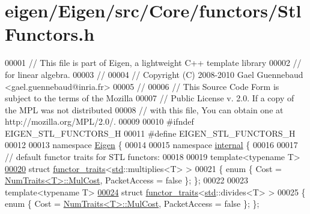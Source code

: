 \hypertarget{eigen_2_eigen_2src_2_core_2functors_2_stl_functors_8h_source}{}\section{eigen/\+Eigen/src/\+Core/functors/\+Stl\+Functors.h}
\label{eigen_2_eigen_2src_2_core_2functors_2_stl_functors_8h_source}

\begin{DoxyCode}
00001 \textcolor{comment}{// This file is part of Eigen, a lightweight C++ template library}
00002 \textcolor{comment}{// for linear algebra.}
00003 \textcolor{comment}{//}
00004 \textcolor{comment}{// Copyright (C) 2008-2010 Gael Guennebaud <gael.guennebaud@inria.fr>}
00005 \textcolor{comment}{//}
00006 \textcolor{comment}{// This Source Code Form is subject to the terms of the Mozilla}
00007 \textcolor{comment}{// Public License v. 2.0. If a copy of the MPL was not distributed}
00008 \textcolor{comment}{// with this file, You can obtain one at http://mozilla.org/MPL/2.0/.}
00009 
00010 \textcolor{preprocessor}{#ifndef EIGEN\_STL\_FUNCTORS\_H}
00011 \textcolor{preprocessor}{#define EIGEN\_STL\_FUNCTORS\_H}
00012 
00013 \textcolor{keyword}{namespace }\hyperlink{namespace_eigen}{Eigen} \{
00014 
00015 \textcolor{keyword}{namespace }\hyperlink{namespaceinternal}{internal} \{
00016 
00017 \textcolor{comment}{// default functor traits for STL functors:}
00018 
00019 \textcolor{keyword}{template}<\textcolor{keyword}{typename} T>
\hyperlink{struct_eigen_1_1internal_1_1functor__traits_3_01std_1_1multiplies_3_01_t_01_4_01_4}{00020} \textcolor{keyword}{struct }\hyperlink{struct_eigen_1_1internal_1_1functor__traits}{functor\_traits}<\hyperlink{namespacestd}{std}::multiplies<T> >
00021 \{ \textcolor{keyword}{enum} \{ Cost = \hyperlink{group___core___module_struct_eigen_1_1_num_traits}{NumTraits<T>::MulCost}, PacketAccess = \textcolor{keyword}{false} \}; \};
00022 
00023 \textcolor{keyword}{template}<\textcolor{keyword}{typename} T>
\hyperlink{struct_eigen_1_1internal_1_1functor__traits_3_01std_1_1divides_3_01_t_01_4_01_4}{00024} \textcolor{keyword}{struct }\hyperlink{struct_eigen_1_1internal_1_1functor__traits}{functor\_traits}<\hyperlink{namespacestd}{std}::divides<T> >
00025 \{ \textcolor{keyword}{enum} \{ Cost = \hyperlink{group___core___module_struct_eigen_1_1_num_traits}{NumTraits<T>::MulCost}, PacketAccess = \textcolor{keyword}{false} \}; \};

\end{DoxyCode}
